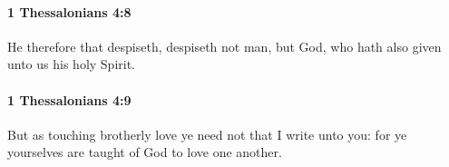 		\paragraph{1 Thessalonians 4:8} %
			\label{1THESSALONIANS-4-8}

			He therefore that despiseth, despiseth not man, but God, who hath also given unto us his holy Spirit.

			\begin{framed}
			\scriptsize
				\begin{compactdesc}
					\item[SBLG] 
				\end{compactdesc}
			\end{framed}

		\paragraph{1 Thessalonians 4:9} %
			\label{1THESSALONIANS-4-9}

			But as touching brotherly love ye need not that I write unto you: for ye yourselves are taught of God to love one another.


